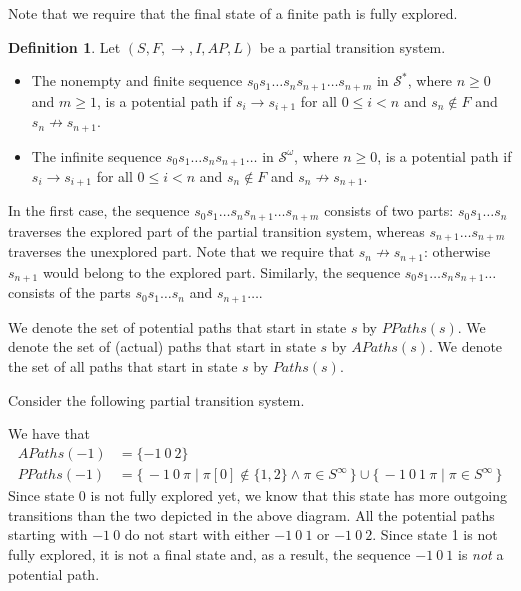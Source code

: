 \documentclass[12pt]{article}
\theoremstyle{definition}
\newtheorem{definition}{Definition}
\begin{document}
Note that we require that the final state of a finite path is fully explored.

\begin{definition}
Let $(S, F, \rightarrow, I, \mathit{AP}, L)$ be a partial transition system.
\begin{itemize}
\item 
The nonempty and finite sequence $s_0 s_1 \ldots s_n s_{n+1} \ldots s_{n+m}$ in $\mathcal{S}^*$, where $n \geq 0$ and $m \geq 1$, is a potential path if $s_i \rightarrow s_{i+1}$ for all $0 \leq i < n$ and $s_n \not\in F$ and $s_n \not\rightarrow s_{n+1}$.
\item 
The infinite sequence $s_0 s_1 \ldots s_n s_{n+1} \ldots$ in $\mathcal{S}^{\omega}$, where $n \geq 0$, is a potential path if $s_i \rightarrow s_{i+1}$ for all $0 \leq i < n$ and $s_n \not\in F$ and $s_n \not\rightarrow s_{n+1}$.
\end{itemize}
\end{definition}

In the first case, the sequence $s_0 s_1 \ldots s_n s_{n+1} \ldots s_{n+m}$ consists of two parts: $s_0 s_1 \ldots s_n$ traverses the explored part of the partial transition system, whereas $s_{n+1} \ldots s_{n+m}$ traverses the unexplored part.  Note that we require that $s_n \not\rightarrow s_{n+1}$: otherwise $s_{n+1}$ would belong to the explored part.  Similarly, the sequence $s_0 s_1 \ldots s_n s_{n+1} \ldots$ consists of the parts $s_0 s_1 \ldots s_n$ and $s_{n+1} \ldots$.  

We denote the set of potential paths that start in state $s$ by $\mathit{PPaths}(s)$.  We denote the set of (actual) paths that start in state $s$ by $\mathit{APaths}(s)$.  We denote the set of all paths that start in state $s$ by $\mathit{Paths}(s)$.

Consider the following partial transition system.
\begin{center}
\end{center}
We have that
\begin{align*}
\mathit{APaths}(-1) & = \{ -1\ 0\ 2 \}\\
\mathit{PPaths}(-1) & = \{\, -1\ 0\ \pi \mid \pi[0] \not\in \{ 1, 2 \} \wedge \pi \in S^{\infty} \,\} \cup \{\, -1\ 0\ 1\ \pi \mid \pi \in S^{\infty} \,\}
\end{align*}
Since state 0 is not fully explored yet, we know that this state has more outgoing transitions than the two depicted in the above diagram.  All the potential paths starting with $-1\ 0$ do not start with either $-1\ 0\ 1$ or $-1\ 0\ 2$.  Since state 1 is not fully explored, it is not a final state and, as a result, the sequence $-1\ 0\ 1$ is \emph{not} a potential path.
\end{document}
